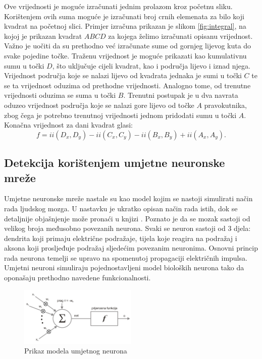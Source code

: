 \documentclass[times, utf8, zavrsni, numeric]{fer}
\begin{document}
Ove vrijednosti je moguće izračunati jednim prolazom kroz početnu sliku. 
Korištenjem ovih suma moguće je izračunati broj crnih elemenata za bilo koji kvadrat na početnoj slici.
Primjer izračuna prikazan je slikom \ref{fig:integral}, na kojoj je prikazan kvadrat $ABCD$ za kojega želimo izračunati opisanu vrijednost. 
Važno je uočiti da su prethodno već izračunate sume od gornjeg lijevog kuta do svake pojedine točke.
Traženu vrijednost je moguće prikazati kao kumulativnu sumu u točki $D$, što uključuje cijeli kvadrat, kao i područja lijevo i iznad njega.
Vrijednost područja koje se nalazi lijevo od kvadrata jednaka je sumi u točki $C$ te se ta vrijednost oduzima od prethodne vrijednosti.
Analogno tome, od trenutne vrijednosti oduzima se suma u točki $B$.
Trenutni postupak je u dva navrata oduzeo vrijednost područja koje se nalazi gore lijevo od točke $A$ pravokutnika, zbog čega je potrebno trenutnoj vrijednosti jednom pridodati sumu u točki $A$.
Konačna vrijednost za dani kvadrat glasi:
\[
    f = ii(D_x, D_y) - ii(C_x, C_y) - ii(B_x, B_y) + ii(A_x, A_y).
\]

\subsection{Detekcija korištenjem umjetne neuronske mreže}
Umjetne neuronske mreže nastale su kao model kojim se nastoji simulirati način rada ljudskog mozga.
U nastavku je ukratko opisan način rada istih, dok se detaljnije objašnjenje može pronaći u knjizi \cite{umjetnaInteligencija}.
Poznato je da se mozak sastoji od velikog broja međusobno povezanih neurona.
Svaki se neuron sastoji od $3$ djela: dendrita koji primaju električne podražaje, tijela koje reagira na podražaj i aksona koji prosljeđuje podražaj sljedećim povezanim neuronima.
Osnovni princip rada neurona temelji se upravo na spomenutoj propagaciji električnih impulsa. 
Umjetni neuroni simuliraju pojednostavljeni model bioloških neurona tako da oponašaju prethodno navedene funkcionalnosti.

\begin{figure}[ht!]
    \centering
    \includegraphics[width=0.5\textwidth]{Images/Neuron.png}
    \captionsetup{justification=centering}
    \caption{Prikaz modela umjetnog neurona}
    \label{fig:neuron}
\end{figure}
\end{document}
